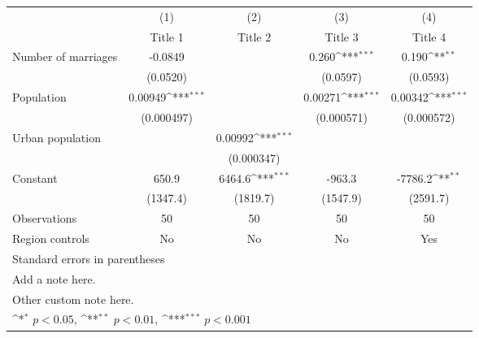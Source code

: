{
\def\sym#1{\ifmmode^{#1}\else\(^{#1}\)\fi}
\begin{tabular}{l*{4}{c}}
\hline\hline
                    &\multicolumn{1}{c}{(1)}&\multicolumn{1}{c}{(2)}&\multicolumn{1}{c}{(3)}&\multicolumn{1}{c}{(4)}\\
                    &\multicolumn{1}{c}{Title 1}&\multicolumn{1}{c}{Title 2}&\multicolumn{1}{c}{Title 3}&\multicolumn{1}{c}{Title 4}\\
\hline
Number of marriages &     -0.0849         &                     &       0.260\sym{***}&       0.190\sym{**} \\
                    &    (0.0520)         &                     &    (0.0597)         &    (0.0593)         \\
[1em]
Population          &     0.00949\sym{***}&                     &     0.00271\sym{***}&     0.00342\sym{***}\\
                    &  (0.000497)         &                     &  (0.000571)         &  (0.000572)         \\
[1em]
Urban population    &                     &     0.00992\sym{***}&                     &                     \\
                    &                     &  (0.000347)         &                     &                     \\
[1em]
Constant            &       650.9         &      6464.6\sym{***}&      -963.3         &     -7786.2\sym{**} \\
                    &    (1347.4)         &    (1819.7)         &    (1547.9)         &    (2591.7)         \\
\hline
Observations        &          50         &          50         &          50         &          50         \\
Region controls     &          No         &          No         &          No         &         Yes         \\
\hline\hline
\multicolumn{5}{l}{\footnotesize Standard errors in parentheses}\\
\multicolumn{5}{l}{\footnotesize Add a note here.}\\
\multicolumn{5}{l}{\footnotesize Other custom note here.}\\
\multicolumn{5}{l}{\footnotesize \sym{*} \(p<0.05\), \sym{**} \(p<0.01\), \sym{***} \(p<0.001\)}\\
\end{tabular}
}
